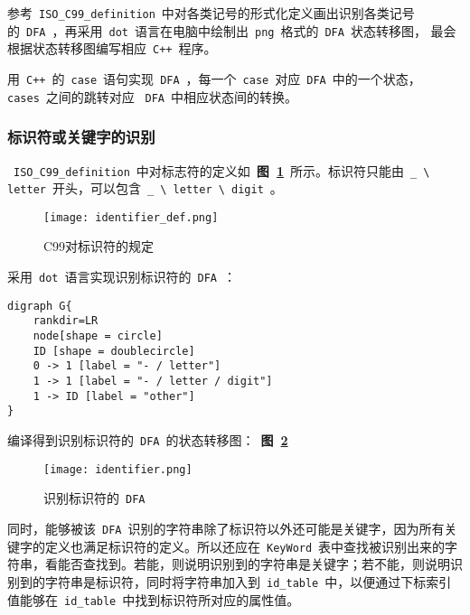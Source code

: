 \documentclass[lang=cn,11pt,a4paper]{paper}
\begin{document}
参考\ \lstinline{ISO_C99_definition}\ 中对各类记号的形式化定义画出识别各类记号的\ \lstinline{DFA}\ ，再采用\ \lstinline{dot}\ 语言在电脑中绘制出\ \lstinline{png}\ 格式的\ \lstinline{DFA}\ 状态转移图， 最会根据状态转移图编写相应\ \lstinline{C++}\ 程序。

用\ \lstinline{C++}\ 的\ \lstinline{case}\ 语句实现\ \lstinline{DFA}\ ，每一个\ \lstinline{case}\ 对应\ \lstinline{DFA}\ 中的一个状态，\lstinline{cases}\ 之间的跳转对应 \ \lstinline{DFA}\ 中相应状态间的转换。

\subsubsection{标识符或关键字的识别}

\ \lstinline{ISO_C99_definition}\ 中对标志符的定义如\ \textbf{图\ \ref{fig:C99对标识符的规定}}\ 所示。标识符只能由\ \lstinline{_ \ letter}\ 开头，可以包含\ \lstinline{_ \ letter \ digit}\ 。

\begin{figure}[!htb]
    \centering
    \texttt{[image: identifier\_def.png]}
    \caption{C99对标识符的规定}
    \label{fig:C99对标识符的规定}
\end{figure}

采用\ \lstinline{dot}\ 语言实现识别标识符的\ \lstinline{DFA}\ ：

\begin{lstlisting}
digraph G{
    rankdir=LR
    node[shape = circle]
    ID [shape = doublecircle]
    0 -> 1 [label = "- / letter"]
    1 -> 1 [label = "- / letter / digit"]
    1 -> ID [label = "other"]
}
\end{lstlisting}

编译得到识别标识符的\ \lstinline{DFA}\ 的状态转移图：\ \textbf{图\ \ref{fig:识别标识符的DFA}}

\begin{figure}[!htb]
    \centering
    \texttt{[image: identifier.png]}
    \caption{识别标识符的\ \lstinline{DFA}}
    \label{fig:识别标识符的DFA}
\end{figure}

同时，能够被该\ \lstinline{DFA}\ 识别的字符串除了标识符以外还可能是关键字，因为所有关键字的定义也满足标识符的定义。所以还应在\ \lstinline{KeyWord}\ 表中查找被识别出来的字符串，看能否查找到。若能，则说明识别到的字符串是关键字；若不能，则说明识别到的字符串是标识符，同时将字符串加入到\ \lstinline{id_table}\ 中，以便通过下标索引值能够在\ \lstinline{id_table}\ 中找到标识符所对应的属性值。
\end{document}
